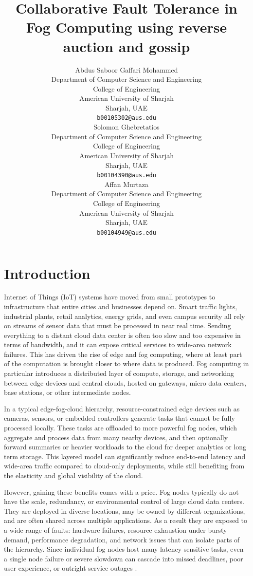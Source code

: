 \documentclass{article}
\title{Collaborative Fault Tolerance in Fog Computing using reverse auction and gossip}
\author{
 Abdus Saboor Gaffari Mohammed \\
  Department of Computer Science and Engineering\\
  College of Engineering\\
  American University of Sharjah\\
  Sharjah, UAE \\
  \texttt{b00105302@aus.edu} \\
   \And
 Solomon Ghebretatios \\
  Department of Computer Science and Engineering\\
  College of Engineering\\
  American University of Sharjah\\
  Sharjah, UAE \\
  \texttt{b00104390@aus.edu} \\
  \And
 Affan Murtaza \\
  Department of Computer Science and Engineering\\
  College of Engineering\\
  American University of Sharjah\\
  Sharjah, UAE \\
  \texttt{b00104949@aus.edu} \\
}
\begin{document}
\maketitle

\begin{abstract}
\lipsum[10]
\end{abstract}



\section{Introduction}

Internet of Things (IoT) systems have moved from small prototypes to infrastructure that entire cities and businesses depend on. Smart traffic lights, industrial plants, retail analytics, energy grids, and even campus security all rely on streams of sensor data that must be processed in near real time. Sending everything to a distant cloud data center is often too slow and too expensive in terms of bandwidth, and it can expose critical services to wide-area network failures. This has driven the rise of edge and fog computing, where at least part of the computation is brought closer to where data is produced. Fog computing in particular introduces a distributed layer of compute, storage, and networking between edge devices and central clouds, hosted on gateways, micro data centers, base stations, or other intermediate nodes.\cite{dasReviewFogComputing2023}


In a typical edge-fog-cloud hierarchy, resource-constrained edge devices such as cameras, sensors, or embedded controllers generate tasks that cannot be fully processed locally. These tasks are offloaded to more powerful fog nodes, which aggregate and process data from many nearby devices, and then optionally forward summaries or heavier workloads to the cloud for deeper analytics or long term storage. This layered model can significantly reduce end-to-end latency and wide-area traffic compared to cloud-only deployments, while still benefiting from the elasticity and global visibility of the cloud\cite{fernandoEdgeFogCloudCollaborationReaping2025}.


However, gaining these benefits comes with a price. Fog nodes typically do not have the scale, redundancy, or environmental control of large cloud data centers. They are deployed in diverse locations, may be owned by different organizations, and are often shared across multiple applications\cite{yiSurveyFogComputing2015}. As a result they are exposed to a wide range of faults: hardware failures, resource exhaustion under bursty demand, performance degradation, and network issues that can isolate parts of the hierarchy. Since individual fog nodes host many latency sensitive tasks, even a single node failure or severe slowdown can cascade into missed deadlines, poor user experience, or outright service outages \cite{macielSurveyReliabilityAvailability2022}.
\end{document}
